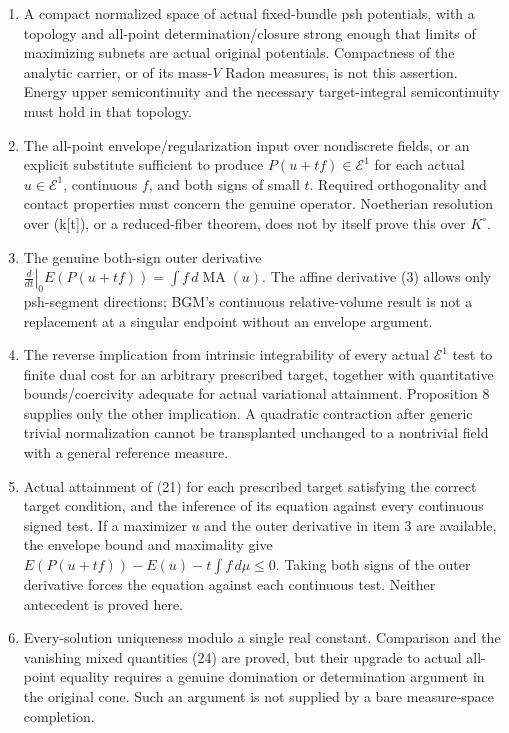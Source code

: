 \documentclass[
]{article}
\providecommand{\tightlist}{%
  \setlength{\itemsep}{0pt}\setlength{\parskip}{0pt}}
\begin{document}
\begin{enumerate}
\def\labelenumi{\arabic{enumi}.}
\tightlist
\item
  A compact normalized space of actual fixed-bundle psh potentials, with
  a topology and all-point determination/closure strong enough that
  limits of maximizing subnets are actual original potentials.
  Compactness of the analytic carrier, or of its mass-\(V\) Radon
  measures, is not this assertion. Energy upper semicontinuity and the
  necessary target-integral semicontinuity must hold in that topology.
\item
  The all-point envelope/regularization input over nondiscrete fields,
  or an explicit substitute sufficient to produce
  \(P(u+tf)\in\mathcal E^1\) for each actual \(u\in\mathcal E^1\),
  continuous \(f\), and both signs of small \(t\). Required
  orthogonality and contact properties must concern the genuine
  operator. Noetherian resolution over (k{[}t{]}), or a reduced-fiber
  theorem, does not by itself prove this over \(K^\circ\).
\item
  The genuine both-sign outer derivative
  \(\left.\frac d{dt}\right|_0E(P(u+tf))=\int f\,d\operatorname{MA}(u)\).
  The affine derivative (3) allows only psh-segment directions; BGM's
  continuous relative-volume result is not a replacement at a singular
  endpoint without an envelope argument.
\item
  The reverse implication from intrinsic integrability of every actual
  \(\mathcal E^1\) test to finite dual cost for an arbitrary prescribed
  target, together with quantitative bounds/coercivity adequate for
  actual variational attainment. Proposition 8 supplies only the other
  implication. A quadratic contraction after generic trivial
  normalization cannot be transplanted unchanged to a nontrivial field
  with a general reference measure.
\item
  Actual attainment of (21) for each prescribed target satisfying the
  correct target condition, and the inference of its equation against
  every continuous signed test. If a maximizer \(u\) and the outer
  derivative in item 3 are available, the envelope bound and maximality
  give \(E(P(u+tf))-E(u)-t\int f\,d\mu\leq0\). Taking both signs of the
  outer derivative forces the equation against each continuous test.
  Neither antecedent is proved here.
\item
  Every-solution uniqueness modulo a single real constant. Comparison
  and the vanishing mixed quantities (24) are proved, but their upgrade
  to actual all-point equality requires a genuine domination or
  determination argument in the original cone. Such an argument is not
  supplied by a bare measure-space completion.
\end{enumerate}
\end{document}
